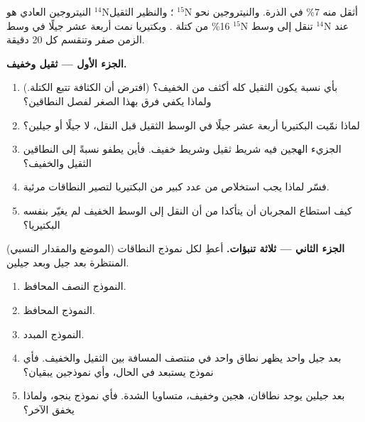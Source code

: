 \begin{problem}
\label{pb:g11:dna-replication:1}
النيتروجين العادي هو $^{14}$N؛ والنظير الثقيل $^{15}$N أثقل منه 7\%
في الذرة. والنيتروجين نحو 16\% من كتلة . وبكتيريا نمت أربعة عشر
جيلًا في وسط $^{15}$N تنقل إلى وسط $^{14}$N عند الزمن صفر وتنقسم كل
20 دقيقة.

\medskip
\noindent\textbf{الجزء الأول --- ثقيل وخفيف.}
\begin{enumerate}
  \item بأي نسبة يكون  الثقيل كله أكثف من  الخفيف؟ (افترض أن
        الكثافة تتبع الكتلة.) ولماذا يكفي فرق بهذا الصغر لفصل
        النطاقين؟
  \item لماذا نمّيت البكتيريا أربعة عشر جيلًا في الوسط الثقيل قبل
        النقل، لا جيلًا أو جيلين؟
  \item الجزيء الهجين فيه شريط ثقيل وشريط خفيف. فأين يطفو نسبةً إلى
        النطاقين الثقيل والخفيف؟
  \item فسّر لماذا يجب استخلاص  من عدد كبير من البكتيريا لتصير
        النطاقات مرئية.
  \item كيف استطاع المجربان أن يتأكدا من أن النقل إلى الوسط الخفيف لم
        يغيّر بنفسه  البكتيريا؟
\end{enumerate}

\medskip
\noindent\textbf{الجزء الثاني --- ثلاثة تنبؤات.}
أعطِ لكل نموذج النطاقات (الموضع والمقدار النسبي) المنتظرة بعد جيل وبعد
جيلين.
\begin{enumerate}[resume]
  \item النموذج النصف المحافظ.
  \item النموذج المحافظ.
  \item النموذج المبدد.
  \item بعد جيل واحد يظهر نطاق واحد في منتصف المسافة بين الثقيل
        والخفيف. فأي نموذج يستبعد في الحال، وأي نموذجين يبقيان؟
  \item بعد جيلين يوجد نطاقان، هجين وخفيف، متساويا الشدة. فأي نموذج
        ينجو، ولماذا يخفق الآخر؟
\end{enumerate}


\end{problem}
